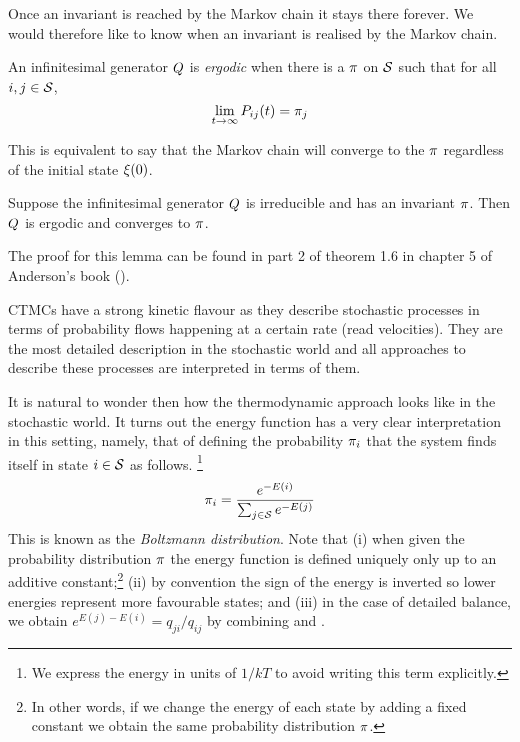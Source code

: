 Once an invariant \pmf is reached by the Markov chain
it stays there forever.
We would therefore like to know when an invariant
\pmf is realised by the Markov chain.

\begin{definition}[ergodicity]
  An infinitesimal generator $Q$ is \emph{ergodic} when
  there is a \pmf $\pi$ on $\mathcal{S}$ such that
  for all $i,j \in \mathcal{S}$,
  \[ \lim_{t \to \infty} P_{ij}(t) = \pi_j \]
\end{definition}

This is equivalent to say that the Markov chain
will converge to the \pmf $\pi$
regardless of the initial state $\xi(0)$.

\begin{lemma}
  Suppose the infinitesimal generator $Q$ is irreducible
  and has an invariant \pmf $\pi$.
  Then $Q$ is ergodic and converges to $\pi$.
\end{lemma}

The proof for this lemma can be found in part 2 of theorem 1.6
in chapter 5 of Anderson's book (\cite*[][pages 160--161]{anderson}).

CTMCs have a strong kinetic flavour as they describe
stochastic processes in terms of probability flows
happening at a certain rate (read velocities).
They are the most detailed description in the stochastic world
and all approaches to describe these processes
are interpreted in terms of them.

It is natural to wonder then how the thermodynamic approach
looks like in the stochastic world.
It turns out the energy function has a very clear interpretation
in this setting, namely, that of defining the probability $\pi_i$
that the system finds itself in state $i \in \mathcal{S}$ as follows.%
\footnote{
  We express the energy in units of $1/kT$
  to avoid writing this term explicitly.}
\begin{equation}
  \label{eq:energy}
  \pi_i = \frac{e^{-E(i)}}{\sum_{j \in \mathcal{S}} e^{-E(j)}}
\end{equation}
This is known as the \emph{Boltzmann distribution}.
Note that
(i) when given the probability distribution $\pi$
the energy function is defined uniquely
only up to an additive constant;\footnote{
  In other words, if we change the energy of each state by adding
  a fixed constant we obtain the same probability distribution $\pi$.}
(ii) by convention the sign of the energy is inverted
so lower energies represent more favourable states; and
(iii) in the case of detailed balance,
we obtain $e^{E(j)-E(i)} = q_{ji}/q_{ij}$
by combining  and .

